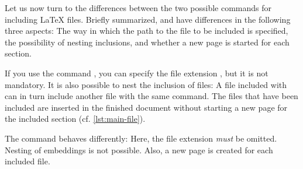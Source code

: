 Let us now turn to the differences between the two possible commands for including \LaTeX{} files. Briefly summarized,  and  have differences in the following three aspects: The way in which the path to the file to be included is specified, the possibility of nesting inclusions, and whether a new page is started for each section.

If you use the command , you can specify the file extension , but it is not mandatory. It is also possible to nest the inclusion of files: A file included with  can in turn include another file with the same command. The files that have been included are inserted in the finished document without starting a new page for the included section (cf. \cref{lst:main-file}).

The command  behaves differently: Here, the file 
extension  \emph{must} be omitted. Nesting of embeddings is not 
possible. Also, a new page is created for each included file.
